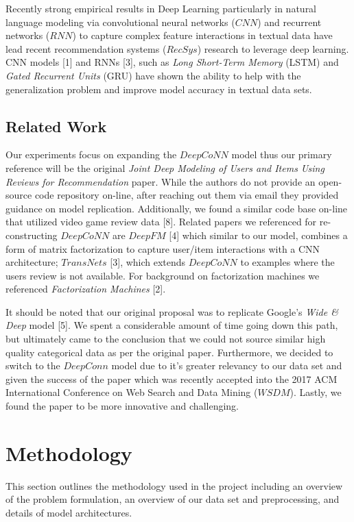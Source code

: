 \documentclass[10pt,twocolumn,letterpaper]{article}
\begin{document}
\par Recently strong empirical results in Deep Learning particularly in natural language modeling via convolutional neural networks ($CNN$) and recurrent networks ($RNN$) to capture complex feature interactions in textual data have lead recent recommendation systems ($RecSys$) research to leverage  deep learning. CNN models [1] and RNNs [3], such as \textit{Long Short-Term Memory} (LSTM) and \textit{Gated Recurrent Units} (GRU) have shown the ability to help with the generalization problem and improve model accuracy in textual data sets.

\subsection{Related Work}
Our experiments focus on expanding the $DeepCoNN$ model thus our primary reference will be the original \textit{Joint Deep Modeling of Users and Items Using Reviews for Recommendation} paper. While the authors do not provide an open-source code repository on-line, after reaching out them via email they provided guidance on model replication. Additionally, we found a similar code base on-line that utilized video game review data [8]. Related papers we referenced for re-constructing $DeepCoNN$ are $DeepFM$ [4] which similar to our model, combines a form of matrix factorization to capture user/item interactions with a CNN architecture; $TransNets$ [3], which extends $DeepCoNN$ to examples where the users review is not available. For background on factorization machines we referenced \textit{Factorization Machines} [2]. 


It should be noted that our original proposal was to replicate Google's \textit{Wide \& Deep} model [5]. We spent a considerable amount of time going down this path, but ultimately came to the conclusion that we could not source similar high quality categorical data as per the original paper. Furthermore, we decided to switch to the $DeepConn$ model due to it's greater relevancy to our data set and given the success of the paper which was recently accepted into the 2017 ACM International Conference on Web Search and Data Mining ($WSDM$). Lastly, we found the paper to be more innovative and challenging.

\section{Methodology}
This section outlines the methodology used in the project including an overview of the problem formulation, an overview of our data set and preprocessing, and details of model architectures.
\end{document}

